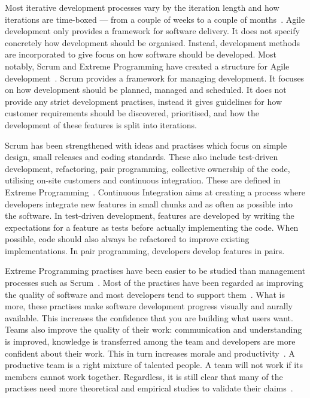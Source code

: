 \documentclass[english]{tktltiki2}
\begin{document}
Most iterative development processes vary by the iteration length and how iterations are time-boxed — from a couple of weeks to a couple of months~\cite{LB03}. Agile development only provides a framework for software delivery. It does not specify concretely how development should be organised. Instead, development methods are incorporated to give focus on how software should be developed. Most notably, Scrum and Extreme Programming have created a structure for Agile development~\cite{LB03, Fow05, SS10}. Scrum provides a framework for managing development. It focuses on how development should be planned, managed and scheduled. It does not provide any strict development practises, instead it gives guidelines for how customer requirements should be discovered, prioritised, and how the development of these features is split into iterations.

Scrum has been strengthened with ideas and practises which focus on simple design, small releases and coding standards. These also include test-driven development, refactoring, pair programming, collective ownership of the code, utilising on-site customers and continuous integration. These are defined in Extreme Programming~\cite{Bec00}. Continuous Integration aims at creating a process where developers integrate new features in small chunks and as often as possible into the software. In test-driven development, features are developed by writing the expectations for a feature as tests before actually implementing the code. When possible, code should also always be refactored to improve existing implementations. In pair programming, developers develop features in pairs.

Extreme Programming practises have been easier to be studied than management processes such as Scrum~\cite{DD08, DNB12, KRM13}. Most of the practises have been regarded as improving the quality of software and most developers tend to support them~\cite{DD08, SS10}. What is more, these practises make software development progress visually and aurally available. This increases the confidence that you are building what users want. Teams also improve the quality of their work: communication and understanding is improved, knowledge is transferred among the team and developers are more confident about their work. This in turn increases morale and productivity~\cite{SS10, LTR14}. A productive team is a right mixture of talented people. A team will not work if its members cannot work together. Regardless, it is still clear that many of the practises need more theoretical and empirical studies to validate their claims~\cite{DD08}.
\end{document}
